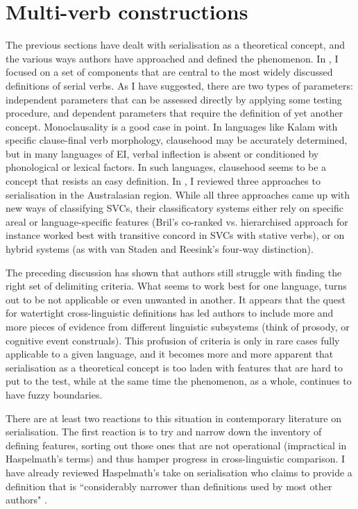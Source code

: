 \section{Multi-verb constructions} \label{section:multi-verbconstructions}

The previous sections have dealt with serialisation as a theoretical concept, and the various ways authors have approached and defined the phenomenon. In , I focused on a set of components that are central to the most widely discussed definitions of serial verbs. As I have suggested, there are two types of parameters: independent parameters that can be assessed directly by applying some testing procedure, and dependent parameters that require the definition of yet another concept. Monoclausality is a good case in point. In languages like Kalam with specific clause-final verb morphology, clausehood may be accurately determined, but in many languages of EI, verbal inflection is absent or conditioned by phonological or lexical factors. In such languages, clausehood seems to be a concept that resists an easy definition. In , I reviewed three approaches to serialisation in the Australasian region. While all three approaches came up with new ways of classifying SVCs, their classificatory systems either rely on specific areal or language-specific features (Bril's co-ranked vs. hierarchised approach for instance worked best with transitive concord in SVCs with stative verbs), or on hybrid systems (as with van Staden and Reesink's four-way distinction).

The preceding discussion has shown that authors still struggle with finding the right set of delimiting criteria. What seems to work best for one language, turns out to be not applicable or even unwanted in another. It appears that the quest for watertight cross-linguistic definitions has led authors to include more and more pieces of evidence from different linguistic subsystems (think of prosody, or cognitive event construals). This profusion of criteria is only in rare cases fully applicable to a given language, and it becomes more and more apparent that serialisation as a theoretical concept is too laden with features that are hard to put to the test, while at the same time the phenomenon, as a whole, continues to have fuzzy boundaries. 

There are at least two reactions to this situation in contemporary literature on serialisation. The first reaction is to try and narrow down the inventory of defining features, sorting out those ones that are not operational (impractical in Haspelmath's terms) and thus hamper progress in cross-linguistic comparison. I have already reviewed Haspelmath's take on serialisation who claims to provide a definition that is ``considerably narrower than definitions used by most other authors" \citep[6]{haspelmath2016serial}. 

